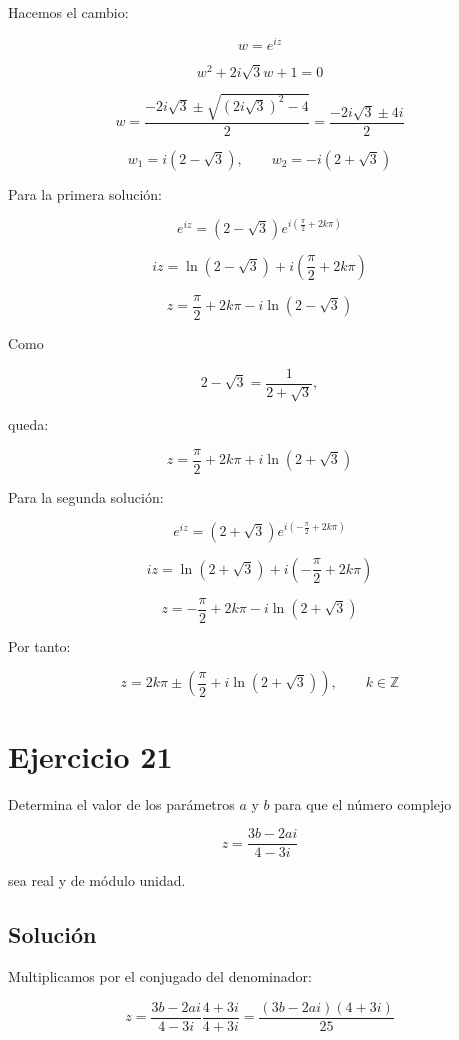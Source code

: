\documentclass[fleqn]{article}
\begin{document}
		Hacemos el cambio:

		\[
		w=e^{iz}
		\]

		\[
		w^2+2i\sqrt{3}w+1=0
		\]

		\[
		w
		=
		\frac{-2i\sqrt{3}\pm\sqrt{(2i\sqrt{3})^2-4}}{2}
		=
		\frac{-2i\sqrt{3}\pm4i}{2}
		\]

		\[
		w_1=i(2-\sqrt{3}),
		\qquad
		w_2=-i(2+\sqrt{3})
		\]

		Para la primera solución:

		\[
		e^{iz}
		=
		(2-\sqrt{3})e^{i\left(\frac{\pi}{2}+2k\pi\right)}
		\]

		\[
		iz
		=
		\ln(2-\sqrt{3})
		+
		i\left(\frac{\pi}{2}+2k\pi\right)
		\]

		\[
		z
		=
		\frac{\pi}{2}+2k\pi
		-i\ln(2-\sqrt{3})
		\]

		Como

		\[
		2-\sqrt{3}=\frac{1}{2+\sqrt{3}},
		\]

		queda:

		\[
		z
		=
		\frac{\pi}{2}+2k\pi
		+i\ln(2+\sqrt{3})
		\]

		Para la segunda solución:

		\[
		e^{iz}
		=
		(2+\sqrt{3})e^{i\left(-\frac{\pi}{2}+2k\pi\right)}
		\]

		\[
		iz
		=
		\ln(2+\sqrt{3})
		+
		i\left(-\frac{\pi}{2}+2k\pi\right)
		\]

		\[
		z
		=
		-\frac{\pi}{2}+2k\pi
		-i\ln(2+\sqrt{3})
		\]

		Por tanto:

		\[
		\boxed{
		z
		=
		2k\pi
		\pm
		\left(
		\frac{\pi}{2}
		+i\ln(2+\sqrt{3})
		\right),
		\qquad k\in\mathbb{Z}
		}
		\]
	
	\section{Ejercicio 21}
		Determina el valor de los parámetros $a$ y $b$ para que el número complejo

		\[
		z=\frac{3b-2ai}{4-3i}
		\]

		sea real y de módulo unidad.

		\subsection{Solución}

		Multiplicamos por el conjugado del denominador:

		\[
		z
		=
		\frac{3b-2ai}{4-3i}
		\frac{4+3i}{4+3i}
		=
		\frac{(3b-2ai)(4+3i)}{25}
		\]
\end{document}
